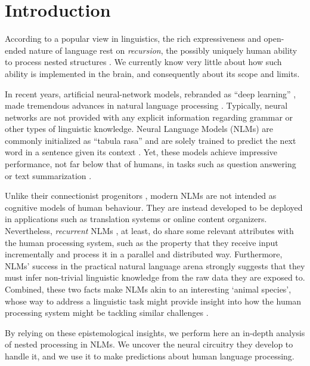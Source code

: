 \section{Introduction}

According to a popular view in linguistics, the rich expressiveness and open-ended nature of language rest on \emph{recursion}, the possibly uniquely human ability to process nested structures \citep{Chomsky:1957, Hauser:etal:2002, Dehaene:etal:2015}. 
We currently know very little about how such ability is implemented in the brain, and consequently about its scope and limits.

In recent years, artificial neural-network models, rebranded as ``deep learning'' \citep{LeCun:etal:2015}, made tremendous advances in natural language processing \citep{Goldberg:2017}. Typically, neural networks are not provided with any explicit information regarding grammar or other types of linguistic knowledge. Neural Language Models (NLMs) are commonly initialized as ``tabula rasa'' and are solely trained to predict the next word in a sentence given its context \citep{Mikolov:2012}. Yet, these models achieve impressive performance, not far below that of humans, in tasks such as question answering or text summarization \citep{Radford:etal:2019}. 

Unlike their connectionist progenitors \citep{Rumelhart:etal:1986,Rumelhart:etal:1986b}, modern NLMs are not intended as cognitive models of human behaviour. 
They are instead developed to be deployed in applications such as translation systems or online content organizers. 
Nevertheless, \emph{recurrent} NLMs  \citep{Elman:1990,Hochreiter:Schmidhuber:1997}, at least, do share some relevant attributes with the human processing system, such as the property that they receive input incrementally  and process it in a parallel and distributed way. Furthermore, NLMs' success in the practical natural language arena strongly suggests that they must infer non-trivial linguistic knowledge from the raw data they are exposed to. %
Combined, these two facts make NLMs akin to an interesting `animal species', whose way to address a linguistic task might provide insight into how the human processing system might be tackling similar challenges \citep[see also][]{McCloskey:1991}.

By relying on these epistemological insights, we perform here an in-depth analysis of nested processing in NLMs. 
We uncover the neural circuitry they develop to handle it, and we use it to make predictions about human language processing. 
%

